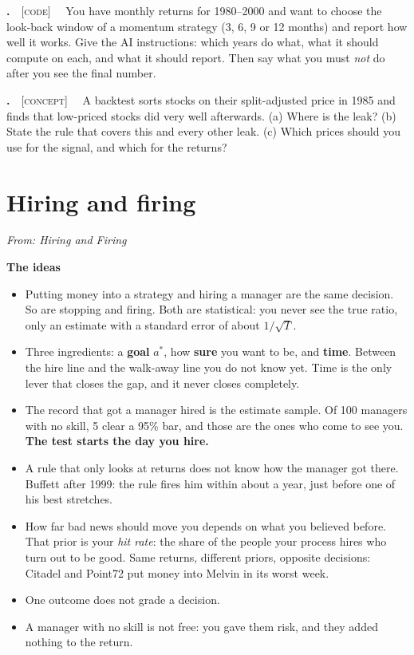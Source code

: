 \documentclass[11pt]{article}
\newcounter{ex}[section]
\renewcommand{\theex}{\thesection.\arabic{ex}}
\newenvironment{ex}[1][calculation]{\refstepcounter{ex}\par\medskip\textbf{\theex}\ \ {\small\textsc{[#1]}}\ \ }{\par}
\newcommand{\head}[1]{\par\medskip\textbf{#1}\par}
\begin{document}
\begin{ex}[code]\label{ex:7.7}
You have monthly returns for 1980--2000 and want to choose the look-back window of a momentum strategy (3, 6, 9 or 12
months) and report how well it works. Give the AI instructions: which years do what, what it should compute on each,
and what it should report. Then say what you must \emph{not} do after you see the final number.
\end{ex}

\begin{ex}[concept]\label{ex:7.8}
A backtest sorts stocks on their split-adjusted price in 1985 and finds that low-priced stocks did very well afterwards.
(a) Where is the leak? (b) State the rule that covers this and every other leak. (c) Which prices should you use for
the signal, and which for the returns?
\end{ex}

\section{Hiring and firing}
{\small\emph{From: Hiring and Firing}}

\head{The ideas}
\begin{itemize}
\item Putting money into a strategy and hiring a manager are the same decision. So are stopping and firing. Both are
statistical: you never see the true ratio, only an estimate with a standard error of about $1/\sqrt{T}$.
\item Three ingredients: a \textbf{goal} $a^{*}$, how \textbf{sure} you want to be, and \textbf{time}. Between the hire
line and the walk-away line you do not know yet. Time is the only lever that closes the gap, and it never closes
completely.
\item The record that got a manager hired is the estimate sample. Of 100 managers with no skill, 5 clear a 95\% bar, and
those are the ones who come to see you. \textbf{The test starts the day you hire.}
\item A rule that only looks at returns does not know how the manager got there. Buffett after 1999: the rule fires him
within about a year, just before one of his best stretches.
\item How far bad news should move you depends on what you believed before. That prior is your \emph{hit rate}: the share
of the people your process hires who turn out to be good. Same returns, different priors, opposite decisions: Citadel
and Point72 put money into Melvin in its worst week.
\item One outcome does not grade a decision.
\item A manager with no skill is not free: you gave them risk, and they added nothing to the return.
\end{itemize}
\end{document}
